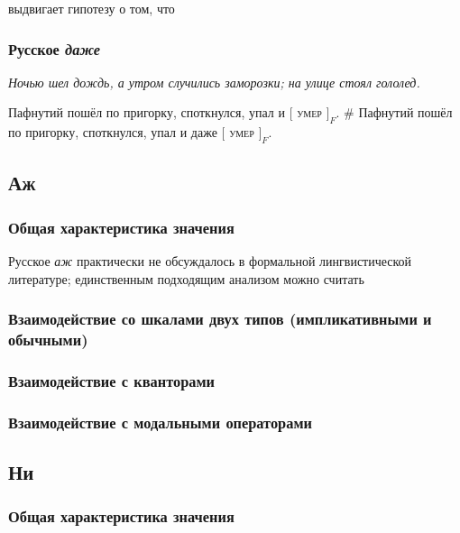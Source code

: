 \documentclass[a4paper, titlepage, 12pt]{article}
\begin{document}
\citep{wagner2015additivity} выдвигает гипотезу о том, что 

\medskip

\subsubsection{Русское \textit{даже}}

\begin{exe}
    \ex \textit{Ночью шел дождь, а утром случились заморозки; на улице стоял гололед.} \begin{xlist}
        \ex Пафнутий пошёл по пригорку, споткнулся, упал и $[$ \textsc{умер} $]_F$. 
        \ex \# Пафнутий пошёл по пригорку, споткнулся, упал и даже $[$ \textsc{умер} $]_F$.
    \end{xlist}
\end{exe}

\subsection{Аж} \label{azh}

\subsubsection{Общая характеристика значения}

Русское \textit{аж} практически не обсуждалось в формальной лингвистической литературе; единственным подходящим анализом можно считать \citep{}

\subsubsection{Взаимодействие со шкалами двух типов (импликативными и обычными)}
\subsubsection{Взаимодействие с кванторами}
\subsubsection{Взаимодействие с модальными операторами}


\subsection{Ни} \label{ni}

\subsubsection{Общая характеристика значения}
\end{document}
